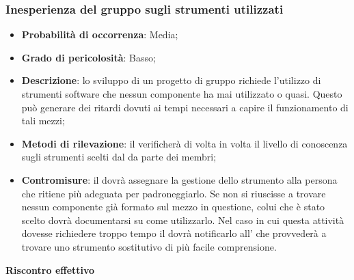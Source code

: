 		\subsubsection{Inesperienza del gruppo sugli strumenti utilizzati} %
		\label{ssub:inesperienza_del_gruppo_sugli_strumenti_utilizzati}
			\begin{itemize}
				\item \textbf{Probabilità di occorrenza}: Media;
				\item \textbf{Grado di pericolosità}: Basso;
				\item \textbf{Descrizione}: lo sviluppo di un progetto di gruppo richiede l'utilizzo di strumenti software che nessun componente ha mai utilizzato o quasi. Questo può generare dei ritardi dovuti ai tempi necessari a capire il funzionamento di tali mezzi;
				\item \textbf{Metodi di rilevazione}: il \roleProjectManager{} verificherà di volta in volta il livello di conoscenza sugli strumenti  scelti dal \roleAdministrator{} da parte dei membri;
				\item \textbf{Contromisure}: il \roleProjectManager{} dovrà assegnare la gestione dello strumento alla persona che ritiene più adeguata per padroneggiarlo. Se non si riuscisse a trovare nessun componente già formato sul mezzo in questione, colui che è stato scelto dovrà documentarsi su come utilizzarlo. Nel caso in cui questa attività dovesse richiedere troppo tempo il \roleProjectManager{} dovrà notificarlo all'\roleAdministrator{} che provvederà a trovare uno strumento sostitutivo di più facile comprensione.
			\end{itemize}
		\noindent
		\textbf{Riscontro effettivo}
